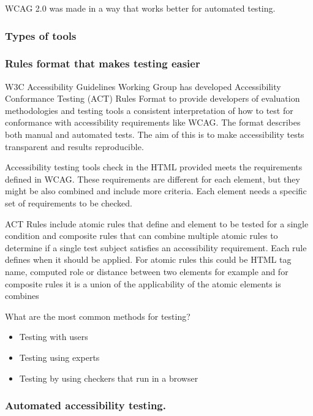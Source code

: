 \documentclass{master_thesis}
\begin{document}
WCAG 2.0 was made in a way that works better for automated testing. 

\subsubsection{Types of tools}
\subsubsection{Rules format that makes testing easier}

W3C Accessibility Guidelines Working Group has developed Accessibility Conformance Testing (ACT) Rules Format to provide developers of evaluation methodologies and testing tools a consistent interpretation of how to test for conformance with accessibility requirements like WCAG. The format describes both manual and automated tests. The aim of this is to make accessibility tests transparent and results reproducible. \citep{Fiers2019}

Accessibility testing tools check in the HTML provided meets the requirements defined in WCAG. These requirements are different for each element, but they might be also combined and include more criteria. Each element needs a specific set of requirements to be checked.

ACT Rules include atomic rules that define and element to be tested for a single condition and composite rules that can combine multiple atomic rules to determine if a single test subject satisfies an accessibility requirement. Each rule defines when it should be applied. For atomic rules this could be HTML tag name, computed role or distance between two elements for example and for composite rules it is a union of the applicability of the atomic elements is combines  \citep{Fiers2019}


\citep{Sane2021}
\citep{AbouZahra2020}
\citep{Alsaeedi2020}
\citep{WebAIM2019}
What are the most common methods for testing?

\begin{itemize}
	\item Testing with users
	\item Testing using experts
	\item Testing by using checkers that run in a browser
\end{itemize}
\subsubsection{Automated accessibility testing.}
\end{document}
